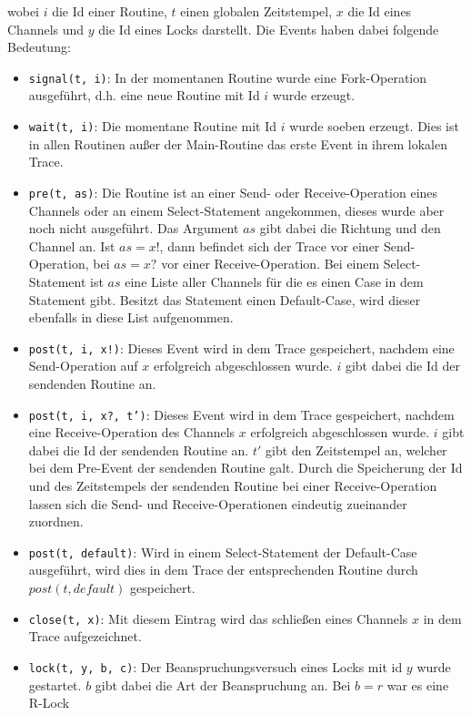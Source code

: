 wobei $i$ die Id einer Routine, $t$ einen globalen Zeitstempel, $x$ die Id eines 
Channels und $y$ die Id eines Locks darstellt. Die Events haben dabei folgende Bedeutung:
\begin{itemize}
  \item \texttt{signal(t, i)}: In der momentanen Routine wurde
    eine Fork-Operation ausgeführt,
    d.h. eine neue Routine mit Id $i$ wurde erzeugt.
  \item \texttt{wait(t, i)}: Die momentane Routine mit Id $i$ wurde soeben erzeugt. Dies ist 
    in allen Routinen außer der Main-Routine das erste Event in ihrem lokalen Trace.
  \item \texttt{pre(t, as)}: Die Routine ist an einer Send- oder Receive-Operation eines 
    Channels oder an einem Select-Statement angekommen, dieses wurde aber noch nicht 
    ausgeführt. Das Argument $as$ gibt dabei die Richtung und den Channel an. 
    Ist $as = x!$, dann befindet sich der Trace vor einer Send-Operation, bei 
    $as = x?$ vor einer Receive-Operation. Bei einem Select-Statement ist 
    $as$ eine Liste aller Channels für die es einen 
    Case in dem Statement gibt. Besitzt das Statement einen Default-Case, wird
    dieser ebenfalls in diese List aufgenommen.
  \item \texttt{post(t, i, x!)}: Dieses Event wird in dem Trace gespeichert, nachdem 
    eine Send-Operation auf $x$ erfolgreich abgeschlossen wurde. 
    $i$ gibt dabei die Id der sendenden Routine an.
  \item \texttt{post(t, i, x?, t')}: Dieses Event wird in dem Trace gespeichert, nachdem 
    eine Receive-Operation des Channels $x$ erfolgreich abgeschlossen wurde. 
    $i$ gibt dabei die Id der sendenden Routine an. $t'$ gibt den Zeitstempel an,
    welcher bei dem Pre-Event der sendenden Routine galt. Durch die Speicherung der Id und des 
    Zeitstempels der sendenden Routine bei einer Receive-Operation lassen sich 
    die Send- und Receive-Operationen eindeutig zueinander zuordnen.
  \item \texttt{post(t, default)}: Wird in einem Select-Statement der Default-Case ausgeführt,
    wird dies in dem Trace der entsprechenden Routine durch $post(t, default)$ 
    gespeichert.
  \item \texttt{close(t, x)}: Mit diesem Eintrag wird das schließen eines Channels $x$ 
    in dem Trace aufgezeichnet.
  \item \texttt{lock(t, y, b, c)}: Der Beanspruchungsversuch eines Locks mit id $y$ wurde gestartet. 
    $b$ gibt dabei die Art der Beanspruchung an. Bei $b = r$ war es eine R-Lock

\end{itemize}
